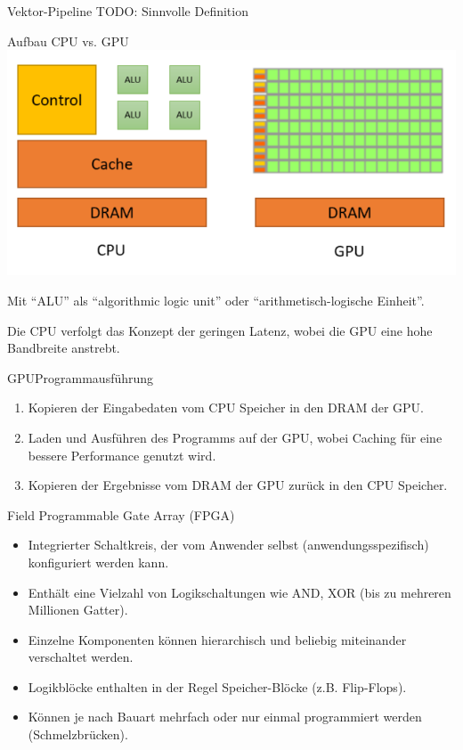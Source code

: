\begin{defi}{Vektor-Pipeline}
    TODO: Sinnvolle Definition
\end{defi}

\begin{defi}{Aufbau CPU vs. GPU}
    \includegraphics[width=\textwidth]{images/CPUvsGPU.png}

    Mit \enquote{ALU} als \enquote{algorithmic logic unit} oder \enquote{arithmetisch-logische Einheit}.

    Die CPU verfolgt das Konzept der geringen Latenz,
    wobei die GPU eine hohe Bandbreite anstrebt.
\end{defi}

\begin{defi}{GPU}{Programmausführung}
    \begin{enumerate}
        \item Kopieren der Eingabedaten vom CPU Speicher in den DRAM der GPU.
        \item Laden und Ausführen des Programms auf der GPU,
              wobei Caching für eine bessere Performance genutzt wird.
        \item Kopieren der Ergebnisse vom DRAM der GPU zurück in den CPU Speicher.
    \end{enumerate}
\end{defi}

\begin{defi}{Field Programmable Gate Array (FPGA)}
    \begin{itemize}
        \item Integrierter Schaltkreis, der vom Anwender selbst (anwendungsspezifisch) konfiguriert werden kann.
        \item Enthält eine Vielzahl von Logikschaltungen wie AND, XOR (bis zu mehreren Millionen Gatter).
        \item Einzelne Komponenten können hierarchisch und beliebig miteinander verschaltet werden.
        \item Logikblöcke enthalten in der Regel Speicher-Blöcke (z.B. Flip-Flops).
        \item Können je nach Bauart mehrfach oder nur einmal programmiert werden (Schmelzbrücken).
    \end{itemize}
\end{defi}

